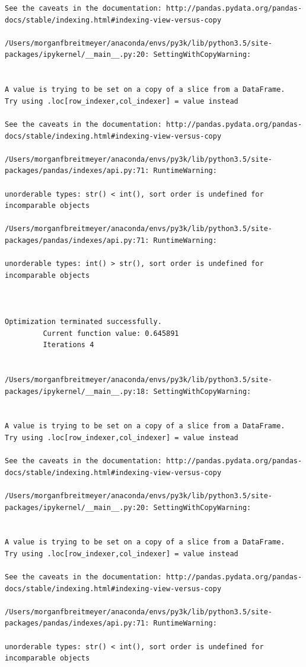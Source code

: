 \begin{lstlisting}
See the caveats in the documentation: http://pandas.pydata.org/pandas-docs/stable/indexing.html#indexing-view-versus-copy

/Users/morganfbreitmeyer/anaconda/envs/py3k/lib/python3.5/site-packages/ipykernel/__main__.py:20: SettingWithCopyWarning:


A value is trying to be set on a copy of a slice from a DataFrame.
Try using .loc[row_indexer,col_indexer] = value instead

See the caveats in the documentation: http://pandas.pydata.org/pandas-docs/stable/indexing.html#indexing-view-versus-copy

/Users/morganfbreitmeyer/anaconda/envs/py3k/lib/python3.5/site-packages/pandas/indexes/api.py:71: RuntimeWarning:

unorderable types: str() < int(), sort order is undefined for incomparable objects

/Users/morganfbreitmeyer/anaconda/envs/py3k/lib/python3.5/site-packages/pandas/indexes/api.py:71: RuntimeWarning:

unorderable types: int() > str(), sort order is undefined for incomparable objects



Optimization terminated successfully.
         Current function value: 0.645891
         Iterations 4


/Users/morganfbreitmeyer/anaconda/envs/py3k/lib/python3.5/site-packages/ipykernel/__main__.py:18: SettingWithCopyWarning:


A value is trying to be set on a copy of a slice from a DataFrame.
Try using .loc[row_indexer,col_indexer] = value instead

See the caveats in the documentation: http://pandas.pydata.org/pandas-docs/stable/indexing.html#indexing-view-versus-copy

/Users/morganfbreitmeyer/anaconda/envs/py3k/lib/python3.5/site-packages/ipykernel/__main__.py:20: SettingWithCopyWarning:


A value is trying to be set on a copy of a slice from a DataFrame.
Try using .loc[row_indexer,col_indexer] = value instead

See the caveats in the documentation: http://pandas.pydata.org/pandas-docs/stable/indexing.html#indexing-view-versus-copy

/Users/morganfbreitmeyer/anaconda/envs/py3k/lib/python3.5/site-packages/pandas/indexes/api.py:71: RuntimeWarning:

unorderable types: str() < int(), sort order is undefined for incomparable objects


\end{lstlisting}
